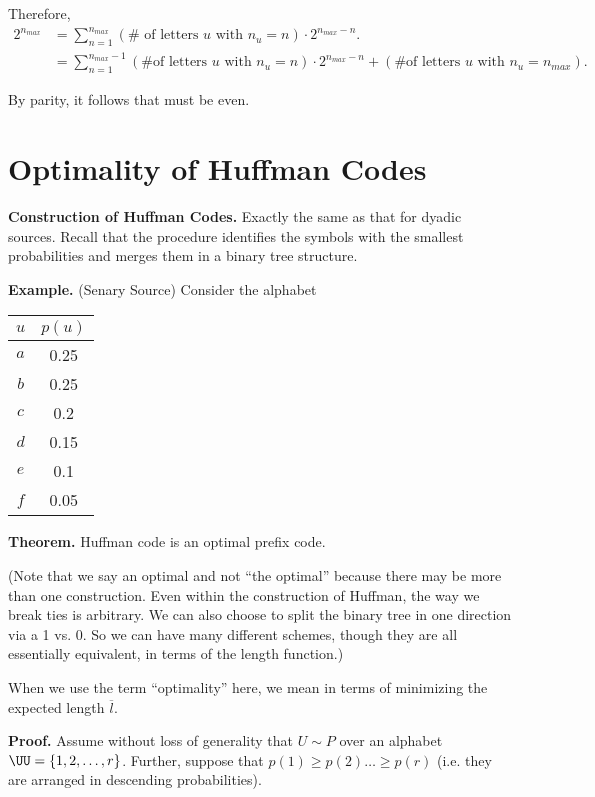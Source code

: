 Therefore,
\begin{align*}
  2^{n_{max}} &= \sum_{n=1}^{n_{max}} (\text{# of letters $u$ with $n_u = n$}) \cdot 2^{n_{max} - n}. \\
  &= \sum_{n=1}^{n_{max}-1} (\text{\# of letters $u$ with $n_u = n$}) \cdot 2^{n_{max} - n} + (\text{\# of letters $u$ with $n_u = n_{max}$}).
\end{align*}

By parity, it follows that  must be even.



\section{Optimality of Huffman Codes}
{\bf Construction of Huffman Codes.}  Exactly the same as that for dyadic sources.  Recall that the procedure identifies the symbols with the smallest probabilities and merges them in a binary tree structure.

{\bf Example.} (Senary Source) Consider the alphabet


\begin{center}
\begin{tabular}{c|c}
  $u$ & $p(u)$ \\ \hline
  $a$ & 0.25 \\
  $b$ & 0.25 \\
  $c$ & 0.2 \\
  $d$ & 0.15 \\
  $e$ & 0.1 \\
  $f$ & 0.05 
\end{tabular}
\end{center}

{\bf Theorem.} Huffman code is an optimal prefix code.

(Note that we say an optimal and not ``the optimal'' because there may be more than one construction.  Even within the construction of Huffman, the way we break ties is arbitrary.  We can also choose to split the binary tree in one direction via a 1 vs. 0.  So we can have many different schemes, though they are all essentially equivalent, in terms of the length function.)

\def\l{\overline{l}}

When we use the term ``optimality'' here, we mean in terms of minimizing the expected length $\l$.

{\bf Proof.} Assume without loss of generality that $U \sim P$ over an alphabet $\UU = \{ 1, 2, \dots, r \}$.  Further, suppose that $p(1) \geq p(2) \dots \geq p(r)$ (i.e. they are arranged in descending probabilities).

